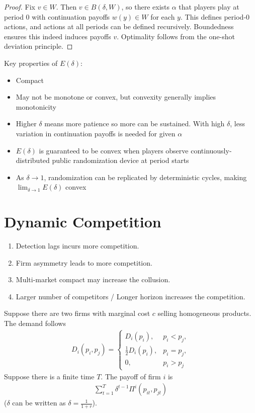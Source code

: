 \documentclass[11pt]{elegantbook_2}
\begin{document}
\begin{proof}
    Fix $v\in W$. Then $v\in B(\delta,W)$, so there exists $\alpha$ that players play at period 0 with continuation payoffs $w(y)\in W$ for each $y$. This defines period-0 actions, and actions at all periods can be defined recursively. Boundedness ensures this indeed induces payoffs $v$. Optimality follows from the one-shot deviation principle.
\end{proof}

Key properties of $E(\delta)$:
\begin{itemize}
    \item Compact
    \item May not be monotone or convex, but convexity generally implies monotonicity
    \item Higher $\delta$ means more patience so more can be sustained. With high $\delta$, less variation in continuation payoffs is needed for given $\alpha$
    \item $E(\delta)$ is guaranteed to be convex when players observe continuously-distributed public randomization device at period starts
    \item As $\delta\rightarrow 1$, randomization can be replicated by deterministic cycles, making $\lim_{\delta\rightarrow 1}E(\delta)$ convex
\end{itemize}





\section{Dynamic Competition}
\begin{enumerate}
    \item Detection lags incurs more competition.
    \item Firm asymmetry leads to more competition.
    \item Multi-market compact may increase the collusion.
    \item Larger number of competitors / Longer horizon increases the competition.
\end{enumerate}


Suppose there are two firms with marginal cost $c$ selling homogeneous products. The demand follows
\begin{equation}
    \begin{aligned}
        D_i(p_i,p_j)=\left\{\begin{matrix}
            D_i(p_i),& p_i<p_j,\\
            \frac{1}{2}D_i(p_i),& p_i=p_j,\\
            0,& p_i>p_j
        \end{matrix}\right.
    \end{aligned}
    \nonumber
\end{equation}
Suppose there is a finite time $T$. The payoff of firm $i$ is
\begin{equation}
    \begin{aligned}
        \sum_{t=1}^T\delta^{t-1} \Pi^i(p_{it},p_{jt})
    \end{aligned}
    \nonumber
\end{equation}
($\delta$ can be written as $\delta=\frac{1}{1+r}$).
\end{document}
